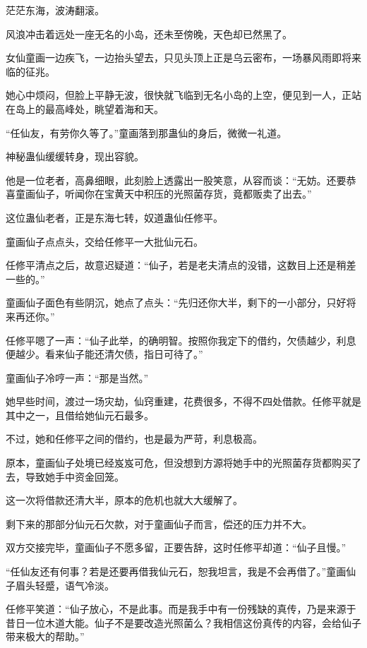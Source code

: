 
\begin{this_body}



茫茫东海，波涛翻滚。

风浪冲击着远处一座无名的小岛，还未至傍晚，天色却已然黑了。

女仙童画一边疾飞，一边抬头望去，只见头顶上正是乌云密布，一场暴风雨即将来临的征兆。

她心中烦闷，但脸上平静无波，很快就飞临到无名小岛的上空，便见到一人，正站在岛上的最高峰处，眺望着海和天。

“任仙友，有劳你久等了。”童画落到那蛊仙的身后，微微一礼道。

神秘蛊仙缓缓转身，现出容貌。

他是一位老者，高鼻细眼，此刻脸上透露出一股笑意，从容而谈：“无妨。还要恭喜童画仙子，听闻你在宝黄天中积压的光照菌存货，竟都贩卖了出去。”

这位蛊仙老者，正是东海七转，奴道蛊仙任修平。

童画仙子点点头，交给任修平一大批仙元石。

任修平清点之后，故意迟疑道：“仙子，若是老夫清点的没错，这数目上还是稍差一些的。”

童画仙子面色有些阴沉，她点了点头：“先归还你大半，剩下的一小部分，只好将来再还你。”

任修平嗯了一声：“仙子此举，的确明智。按照你我定下的借约，欠债越少，利息便越少。看来仙子能还清欠债，指日可待了。”

童画仙子冷哼一声：“那是当然。”

她早些时间，渡过一场灾劫，仙窍重建，花费很多，不得不四处借款。任修平就是其中之一，且借给她仙元石最多。

不过，她和任修平之间的借约，也是最为严苛，利息极高。

原本，童画仙子处境已经岌岌可危，但没想到方源将她手中的光照菌存货都购买了去，导致她手中资金回笼。

这一次将借款还清大半，原本的危机也就大大缓解了。

剩下来的那部分仙元石欠款，对于童画仙子而言，偿还的压力并不大。

双方交接完毕，童画仙子不愿多留，正要告辞，这时任修平却道：“仙子且慢。”

“任仙友还有何事？若是还要再借我仙元石，恕我坦言，我是不会再借了。”童画仙子眉头轻蹙，语气冷淡。

任修平笑道：“仙子放心，不是此事。而是我手中有一份残缺的真传，乃是来源于昔日一位木道大能。仙子不是要改造光照菌么？我相信这份真传的内容，会给仙子带来极大的帮助。”


\end{this_body}

